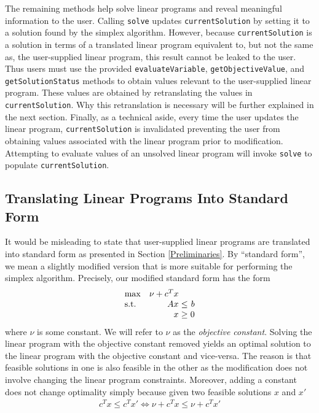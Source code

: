 \documentclass{article}
\newcommand{\javaCode}[1]{\texttt{#1}}
\begin{document}
The remaining methods help solve linear programs and reveal meaningful information to the user. Calling \javaCode{solve} updates \javaCode{currentSolution} by setting it to a solution found by the simplex algorithm. However, because \javaCode{currentSolution} is a solution in terms of a translated linear program equivalent to, but not the same as, the user-supplied linear program, this result cannot be leaked to the user. Thus users must use the provided \javaCode{evaluateVariable}, \javaCode{getObjectiveValue}, and \javaCode{getSolutionStatus} methods to obtain values relevant to the user-supplied linear program. These values are obtained by retranslating the values in \javaCode{currentSolution}. Why this retranslation is necessary will be further explained in the next section. Finally, as a technical aside, every time the user updates the linear program, \javaCode{currentSolution} is invalidated preventing the user from obtaining values associated with the linear program prior to modification. Attempting to evaluate values of an unsolved linear program will invoke \javaCode{solve} to populate \javaCode{currentSolution}. 

\subsection{Translating Linear Programs Into Standard Form} \label{Translation}
It would be misleading to state that user-supplied linear programs are translated into standard form as presented in Section \ref{Preliminaries}. By ``standard form'', we mean a slightly modified version that is more suitable for performing the simplex algorithm. Precisely, our modified standard form has the form
\begin{equation*}
\setlength\arraycolsep{1.5pt}
  \begin{array}{l@{\quad} r c r} 
    \max          & \nu + c^{T}x & & \\
    \mathrm{s.t.} &  Ax & \leq & b \\
                  & x & \geq &  0 \\
  \end{array}
\end{equation*}
where $\nu$ is some constant. We will refer to $\nu$ as the \textit{objective constant}. Solving the linear program with the objective constant removed yields an optimal solution to the linear program with the objective constant and vice-versa. The reason is that feasible solutions in one is also feasible in the other as the modification does not involve changing the linear program constraints. Moreover, adding a constant does not change optimality simply because given two feasible solutions $x$ and $x'$
\begin{align*}
    c^T x \leq c^T x' \iff \nu + c^T x\leq \nu + c^T x'
\end{align*}
\end{document}
